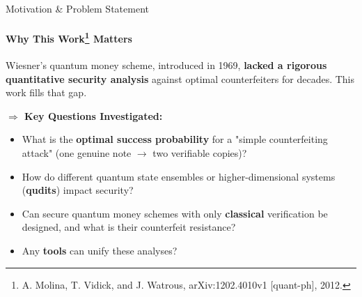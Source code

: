 \documentclass{beamer}
\begin{document}


\begin{frame}{Motivation \& Problem Statement}
    \framesubtitle{Why This Work\footnote{A. Molina, T. Vidick, and J. Watrous, arXiv:1202.4010v1 [quant-ph], 2012.} Matters}
    Wiesner's quantum money scheme, introduced in 1969, \textbf{lacked a rigorous quantitative security analysis} against optimal counterfeiters for decades. This work fills that gap.
    \pause
        
        \textbf{$\Rightarrow$ Key Questions Investigated:}
            \begin{itemize}
                \item What is the \textbf{optimal success probability} for a "simple counterfeiting attack" (one genuine note $\rightarrow$ two verifiable copies)?
                \item How do different quantum state ensembles or higher-dimensional systems (\textbf{qudits}) impact security?
                \item Can secure quantum money schemes with only \textbf{classical} verification be designed, and what is their counterfeit resistance?
                \item Any \textbf{tools} can unify these analyses?
            \end{itemize}
\end{frame}
\end{document}
